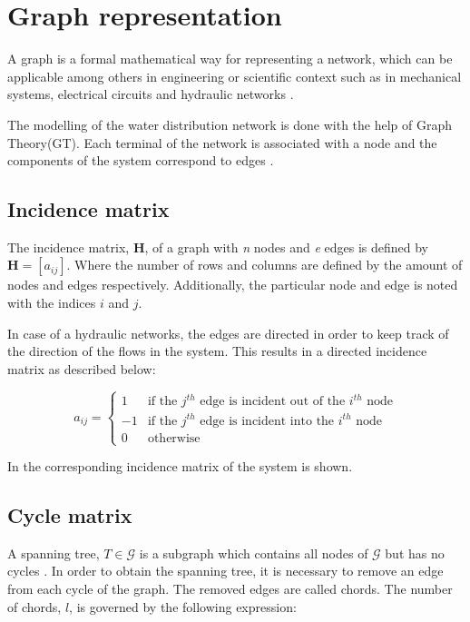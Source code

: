 \section{Graph representation}  
\label{GraphTheory}

A graph is a formal mathematical way for representing a network, which can be applicable among others in engineering or scientific context such as in mechanical systems, electrical circuits and hydraulic networks \cite{graph_intro}. 

The modelling of the water distribution network is done with the help of Graph Theory(GT). Each terminal of the network is associated with a node and the components of the system correspond to edges \cite{GraphTheoryCarsten}. 
\subsection*{Incidence matrix} 
\label{IncidenceSection}
The incidence matrix, $\bm{H}$, of a graph with \textit{n} nodes and \textit{e} edges is 
defined by $\bm{H} = [a_{ij}]$. Where the number of rows and columns are defined by the amount of nodes and edges respectively. 
Additionally, the particular node and edge is noted with the indices $i$ and 
$j$.

In case of a hydraulic networks, the edges are directed in order to keep track of the direction of the flows in the system. This results in a directed incidence matrix as described below:

\begin{equation}
\label{DiGraph}
 a_{ij} =
		\left\{
		\begin{array}{ll}
		
		1 			&      \text{if the $j^{th}$ edge is incident out of the $i^{th}$ node}	
\\
		-1                       &     \text{if the $j^{th}$ edge is incident into the $i^{th}$ node}
\\


                0                       &      \text{otherwise}

		\end{array}
		\right.
\end{equation}	

In  the corresponding incidence matrix of the system is 
shown. 

\subsection*{Cycle matrix}
\label{CycleSection}
A spanning tree, $T \in \mathcal{G}$ is a subgraph which contains all nodes of $\mathcal{G}$ but has no cycles \cite{GraphModel}. 
In order to obtain the spanning tree, it is necessary to remove an edge from each cycle of the graph. The removed edges are called chords. The number of chords, $l$, is governed by the following expression:

